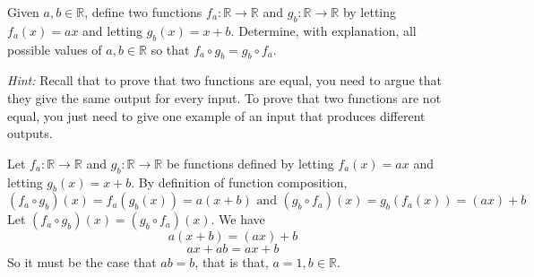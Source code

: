 \documentclass[12pt]{article}
\newenvironment{problem}[2][Problem]
{
	\begin{trivlist} 
		\item[\hskip \labelsep {\bfseries #1 #2:}]
	}
{
	\end{trivlist}
	}
\newenvironment{solution}[1][Solution]
{
	\begin{trivlist} 
		\item[\hskip \labelsep {\itshape #1:}]
	}
	{
	\end{trivlist}
}
\begin{document}
\begin{problem}{4}
\end{problem}







\newpage
\begin{problem}{5}
Given $a,b \in \mathbb{R}$, define two functions $f_{a}:\mathbb{R} \to \mathbb{R}$ and $g_{b}:\mathbb{R} \to \mathbb{R}$ by letting $f_{a}(x)=ax$ and letting $g_{b}(x)=x+b$. Determine, with explanation, all possible values of $a,b \in \mathbb{R}$ so that $f_{a} \circ g_{b} = g_{b} \circ f_{a}$.

\noindent
{\it Hint:} Recall that to prove that two functions are equal, you need to argue that they give the same output for every input. To prove that two functions are not equal, you just need to give one example of an input that produces different outputs.
\begin{solution}
Let $f_{a}:\mathbb{R} \to \mathbb{R}$ and $g_{b}:\mathbb{R} \to \mathbb{R}$ be functions defined by letting $f_{a}(x)=ax$ and letting $g_{b}(x)=x+b$. By definition of function composition,
\[
(f_{a} \circ g_{b})(x)= f_{a}(g_{b}(x)) = a(x+b) \text{ and } (g_{b} \circ f_{a})(x)= g_{b}(f_{a}(x)) = (ax)+b
\]
Let $(f_{a} \circ g_{b})(x)=(g_{b} \circ f_{a})(x)$. We have
\[
a(x+b)=(ax)+b
\]
\[
ax+ab=ax+b
\]
So it must be the case that $ab=b$, that is that, $a=1,b\in \mathbb{R}$.
\end{solution}
\end{problem}

\newpage
\end{document}
